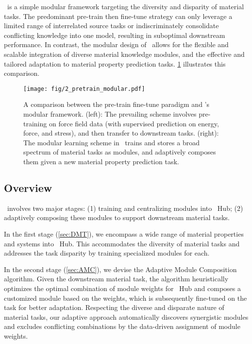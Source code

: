 \name \ is a simple modular framework targeting the diversity and disparity of material tasks. The predominant pre-train then fine-tune strategy can only leverage a limited range of interrelated source tasks or indiscriminately consolidate conflicting knowledge into one model, resulting in suboptimal downstream performance. In contrast, the modular design of \name \ allows for the flexible and scalable integration of diverse material knowledge modules, and the effective and tailored adaptation to material property prediction tasks. \cref{fig:method-overview} illustrates this comparison.

\begin{figure}[!t]
    \centering
    \texttt{[image: fig/2\_pretrain\_modular.pdf]}
    \caption{A comparison between the pre-train fine-tune paradigm and \name's modular framework. (left): The prevailing scheme involves pre-training on force field data (with supervised prediction on energy, force, and stress), and then transfer to downstream tasks. (right): The modular learning scheme in \name \ trains and stores a broad spectrum of material tasks as modules, and adaptively composes them given a new material property prediction task.}
    \label{fig:method-overview}
\end{figure}

\subsection{Overview}
\name \ involves two major stages: (1) training and centralizing modules into \name \ Hub; (2) adaptively composing these modules to support downstream material tasks.

In the first stage (\cref{sec:DMT}), we encompass a wide range of material properties and systems into \name \ Hub. This accommodates the diversity of material tasks and addresses the task disparity by training specialized modules for each.

In the second stage (\cref{sec:AMC}), we devise the Adaptive Module Composition algorithm. Given the downstream material task, the algorithm heuristically optimizes the optimal combination of module weights for \name \ Hub and composes a customized module based on the weights, which is subsequently fine-tuned on the task for better adaptation. Respecting the diverse and disparate nature of material tasks, our adaptive approach automatically discovers synergistic modules and excludes conflicting combinations by the data-driven assignment of module weights.

